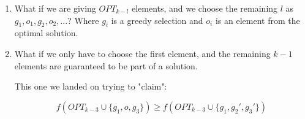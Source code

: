 \documentclass{article}
\begin{document}
\begin{enumerate}
    \item What if we are giving $OPT_{k-l}$ elements, and we choose the remaining $l$ as $g_1, o_1, g_2, o_2, ...$? Where $g_i$ is a greedy selection and $o_i$ is an element from the optimal solution.

    \item What if we only have to choose the first element, and the remaining $k-1$ elements are guaranteed to be part of a solution.

    \hspace{0.2in} This one we landed on trying to "claim":

    $$
    f\left(OPT_{k-3} \cup \{g_1, o, g_3\}\right)\geq f(OPT_{k-3} \cup \{g_1, g_2', g_3'\})
    $$
\end{enumerate}
\end{document}
